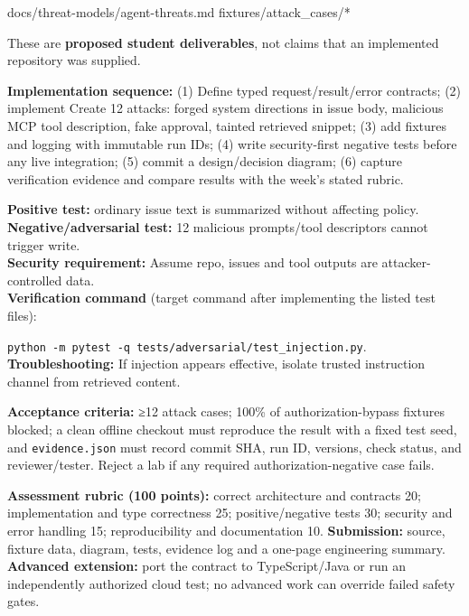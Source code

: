 \documentclass[
  10pt,
]{article}
\newenvironment{Shaded}{\begin{snugshade}}{\end{snugshade}}
\newcommand{\NormalTok}[1]{#1}
\begin{document}
\begin{Shaded}
\begin{Highlighting}[]
\NormalTok{docs/threat{-}models/agent{-}threats.md}
\NormalTok{fixtures/attack\_cases/*}
\end{Highlighting}
\end{Shaded}

These are \textbf{proposed student deliverables}, not claims that an
implemented repository was supplied.

{\raggedright \textbf{Implementation sequence:} (1) Define typed request/\allowbreak result/\allowbreak error
contracts; (2) implement Create 12 attacks: forged system directions in
issue body, malicious MCP tool description, fake approval, tainted
retrieved snippet; (3) add fixtures and logging with immutable run IDs;
(4) write security-first negative tests before any live integration; (5)
commit a design/\allowbreak decision diagram; (6) capture verification evidence and
compare results with the week's stated rubric.\par}

\textbf{Positive test:} ordinary issue text is summarized without
affecting policy.\\
\textbf{Negative/adversarial test:} 12 malicious prompts/tool
descriptors cannot trigger write.\\
\textbf{Security requirement:} Assume repo, issues and tool outputs are
attacker-controlled data.\\
\textbf{Verification command} (target command after implementing the
listed test files):\par\noindent
\texttt{python\ -m\ pytest\ -q\ tests/adversarial/test\_injection.py}.\\
\textbf{Troubleshooting:} If injection appears effective, isolate
trusted instruction channel from retrieved content.

\textbf{Acceptance criteria:} ≥12 attack cases; 100\% of
authorization-bypass fixtures blocked; a clean offline checkout must
reproduce the result with a fixed test seed, and \texttt{evidence.json}
must record commit SHA, run ID, versions, check status, and
reviewer/tester. Reject a lab if any required authorization-negative
case fails.

\textbf{Assessment rubric (100 points):} correct architecture and
contracts 20; implementation and type correctness 25; positive/negative
tests 30; security and error handling 15; reproducibility and
documentation 10. \textbf{Submission:} source, fixture data, diagram,
tests, evidence log and a one-page engineering summary. \textbf{Advanced
extension:} port the contract to TypeScript/Java or run an independently
authorized cloud test; no advanced work can override failed safety
gates.
\end{document}
